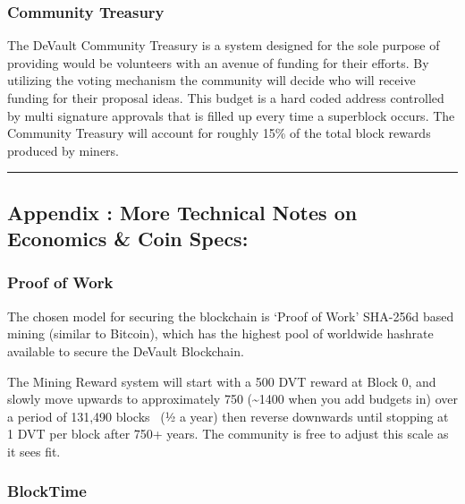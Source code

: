 \hypertarget{h.vbutfuo7a7lt}{%
\subsubsection{\texorpdfstring{{Community
Treasury}}{Community Treasury}}\label{h.vbutfuo7a7lt}}

{The DeVault Community Treasury is a system designed for the sole
purpose of providing would be volunteers with an avenue of funding for
their efforts. By utilizing the voting mechanism the community will
decide who will receive funding for their proposal ideas. This budget is
a hard coded address controlled by multi signature approvals that is
filled up every time a superblock occurs. The Community Treasury will
account for roughly 15\% of the total block rewards produced by miners.}

{}

\begin{center}\rule{0.5\linewidth}{\linethickness}\end{center}

{}

\hypertarget{h.du0i31fxvfpc}{%
\subsection{\texorpdfstring{{Appendix : More Technical Notes on
Economics \& Coin
Specs:}}{Appendix : More Technical Notes on Economics \& Coin Specs:}}\label{h.du0i31fxvfpc}}

\hypertarget{h.okkt77v5o6zl}{%
\subsubsection{\texorpdfstring{{Proof of
Work}}{Proof of Work}}\label{h.okkt77v5o6zl}}

{The chosen model for securing the blockchain is `Proof of Work'
SHA-256d based mining (similar to Bitcoin), which has the highest pool
of worldwide hashrate available to secure the DeVault Blockchain.}

{}

{The Mining Reward system will start with a 500 DVT reward at Block 0,
and slowly move upwards to approximately 750 (\textasciitilde1400 when
you add budgets in) over a period of 131,490 blocks ~(½ a year) then
reverse downwards until stopping at 1 DVT per block after 750+ years.
The community is free to adjust this scale as it sees fit.}

\hypertarget{h.nk0f2drc3fbt}{%
\subsubsection{\texorpdfstring{{BlockTime}}{BlockTime}}\label{h.nk0f2drc3fbt}}

